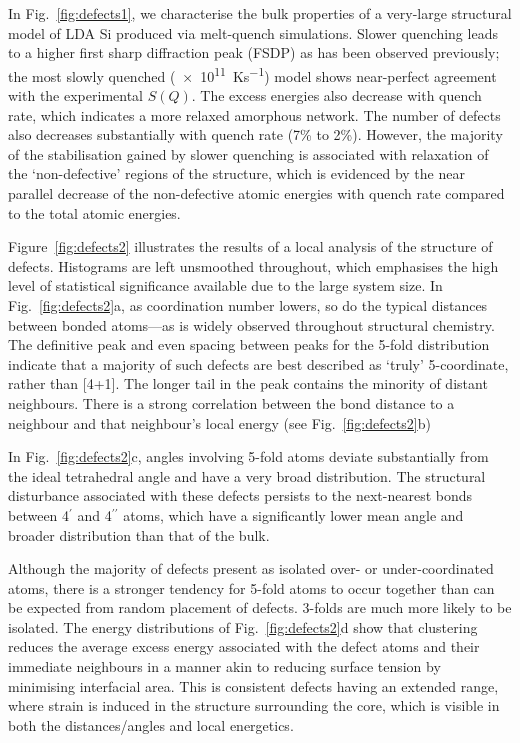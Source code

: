 \documentclass[12pt,a4paper,twoside,nobind]{ociamthesis}
\begin{document}
In Fig.\ \ref{fig:defects1}, we characterise the bulk properties of a very-large structural model of LDA Si produced via melt-quench simulations.
Slower quenching leads to a higher first sharp diffraction peak (FSDP) as has been observed previously;\autocite{Deringer2018d} the most slowly quenched (\SI{e11}{Ks^{-1}}) model shows near-perfect agreement with the experimental $S(Q)$.
The excess energies also decrease with quench rate, which indicates a more relaxed amorphous network. The number of defects also decreases substantially with quench rate (7\% to 2\%).
However, the majority of the stabilisation gained by slower quenching is associated with relaxation of the `non-defective' regions of the structure, 
which is evidenced by the near parallel decrease of the non-defective atomic energies with quench rate compared to the total atomic energies.

Figure\ \ref{fig:defects2} illustrates the results of a local analysis of the structure of defects. 
Histograms are left unsmoothed throughout, which emphasises the high level of statistical significance available due to the large system size.
In Fig.\ \ref{fig:defects2}a, as coordination number lowers, so do the typical distances between bonded atoms---as is widely observed throughout structural chemistry.
The definitive  peak and even spacing between peaks for the 5-fold distribution indicate that a majority of such defects are best described as `truly' 5-coordinate, rather than [4+1]. 
The longer tail in the  peak contains the minority of distant  neighbours. 
There is a strong correlation between the bond distance to a neighbour and that neighbour's local energy (see Fig.\ \ref{fig:defects2}b)

In Fig.\ \ref{fig:defects2}c, angles involving 5-fold atoms deviate substantially
from the ideal tetrahedral angle and have a very broad distribution. 
The structural disturbance associated with these defects persists to the next-nearest bonds between 4$^\prime$ and 4$^{\prime\prime}$ atoms, 
which have a significantly lower mean angle and broader distribution than that of the bulk.

Although the majority of defects present as isolated over- or under-coordinated atoms, there is a stronger tendency for 5-fold atoms to occur together than can be expected from random placement of defects.
3-folds are much more likely to be isolated. The energy distributions of Fig.\ \ref{fig:defects2}d show that clustering reduces the average excess energy associated with the defect atoms and their immediate neighbours
in a manner akin to reducing surface tension by minimising interfacial area. This is consistent defects having an extended range, where strain is induced in the structure surrounding the core, which is
visible in both the distances/angles and local energetics.
\end{document}
